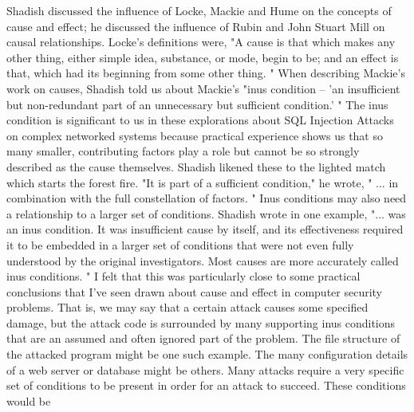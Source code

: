 Shadish discussed the influence of Locke, Mackie and Hume on the concepts of cause and effect; he discussed the influence of Rubin and John Stuart Mill on causal relationships. Locke's definitions were, "A cause is that which makes any other thing, either simple idea, substance, or mode, begin to be; and an effect is that, which had its beginning from some other thing. " When describing Mackie's work on causes, Shadish told us about Mackie's "inus condition -- 'an insufficient but non-redundant part of an unnecessary but sufficient condition.' " The inus condition is significant to us in these explorations about SQL Injection Attacks on complex networked systems because practical experience shows us that so many smaller, contributing factors play a role but cannot be so strongly described as the cause themselves. Shadish likened these to the lighted match which starts the forest fire. "It is part of a sufficient condition," he wrote, " ... in combination with the full constellation of factors. " Inus conditions may also need a relationship to a larger set of conditions. Shadish wrote in one example, "... was an inus condition. It was insufficient cause by itself, and its effectiveness required it to be embedded in a larger set of conditions that were not even fully understood by the original investigators. Most causes are more accurately called inus conditions. " I felt that this was particularly close to some practical conclusions that I've seen drawn about cause and effect in computer security problems. That is, we may say that a certain \gls{attack} causes some specified damage, but the \gls{attack} code is surrounded by many supporting inus conditions that are an assumed and often ignored part of the problem. The file structure of the attacked program might be one such example. The many \gls{configuration} details of a web server or database might be others. Many attacks require a very specific set of conditions to be present in order for an \gls{attack} to succeed. These conditions would be 